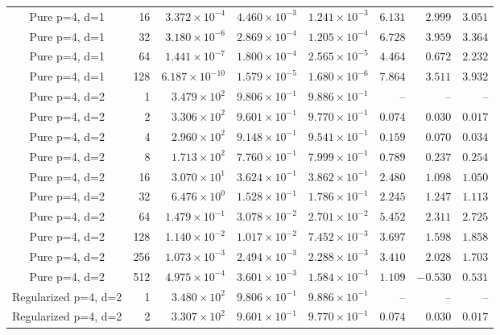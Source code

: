\begin{longtable}{@{}crrrrrrr@{}}
Pure p=4, d=1 & 16 & $3.372\!\times\!10^{-4}$ & $4.460\!\times\!10^{-3}$ & $1.241\!\times\!10^{-3}$ & $6.131$ & $2.999$ & $3.051$ \\
Pure p=4, d=1 & 32 & $3.180\!\times\!10^{-6}$ & $2.869\!\times\!10^{-4}$ & $1.205\!\times\!10^{-4}$ & $6.728$ & $3.959$ & $3.364$ \\
Pure p=4, d=1 & 64 & $1.441\!\times\!10^{-7}$ & $1.800\!\times\!10^{-4}$ & $2.565\!\times\!10^{-5}$ & $4.464$ & $0.672$ & $2.232$ \\
Pure p=4, d=1 & 128 & $6.187\!\times\!10^{-10}$ & $1.579\!\times\!10^{-5}$ & $1.680\!\times\!10^{-6}$ & $7.864$ & $3.511$ & $3.932$ \\
Pure p=4, d=2 & 1 & $3.479\!\times\!10^{2}$ & $9.806\!\times\!10^{-1}$ & $9.886\!\times\!10^{-1}$ & -- & -- & -- \\
Pure p=4, d=2 & 2 & $3.306\!\times\!10^{2}$ & $9.601\!\times\!10^{-1}$ & $9.770\!\times\!10^{-1}$ & $0.074$ & $0.030$ & $0.017$ \\
Pure p=4, d=2 & 4 & $2.960\!\times\!10^{2}$ & $9.148\!\times\!10^{-1}$ & $9.541\!\times\!10^{-1}$ & $0.159$ & $0.070$ & $0.034$ \\
Pure p=4, d=2 & 8 & $1.713\!\times\!10^{2}$ & $7.760\!\times\!10^{-1}$ & $7.999\!\times\!10^{-1}$ & $0.789$ & $0.237$ & $0.254$ \\
Pure p=4, d=2 & 16 & $3.070\!\times\!10^{1}$ & $3.624\!\times\!10^{-1}$ & $3.862\!\times\!10^{-1}$ & $2.480$ & $1.098$ & $1.050$ \\
Pure p=4, d=2 & 32 & $6.476\!\times\!10^{0}$ & $1.528\!\times\!10^{-1}$ & $1.786\!\times\!10^{-1}$ & $2.245$ & $1.247$ & $1.113$ \\
Pure p=4, d=2 & 64 & $1.479\!\times\!10^{-1}$ & $3.078\!\times\!10^{-2}$ & $2.701\!\times\!10^{-2}$ & $5.452$ & $2.311$ & $2.725$ \\
Pure p=4, d=2 & 128 & $1.140\!\times\!10^{-2}$ & $1.017\!\times\!10^{-2}$ & $7.452\!\times\!10^{-3}$ & $3.697$ & $1.598$ & $1.858$ \\
Pure p=4, d=2 & 256 & $1.073\!\times\!10^{-3}$ & $2.494\!\times\!10^{-3}$ & $2.288\!\times\!10^{-3}$ & $3.410$ & $2.028$ & $1.703$ \\
Pure p=4, d=2 & 512 & $4.975\!\times\!10^{-4}$ & $3.601\!\times\!10^{-3}$ & $1.584\!\times\!10^{-3}$ & $1.109$ & $-0.530$ & $0.531$ \\
Regularized p=4, d=2 & 1 & $3.480\!\times\!10^{2}$ & $9.806\!\times\!10^{-1}$ & $9.886\!\times\!10^{-1}$ & -- & -- & -- \\
Regularized p=4, d=2 & 2 & $3.307\!\times\!10^{2}$ & $9.601\!\times\!10^{-1}$ & $9.770\!\times\!10^{-1}$ & $0.074$ & $0.030$ & $0.017$ \\

\end{longtable}
